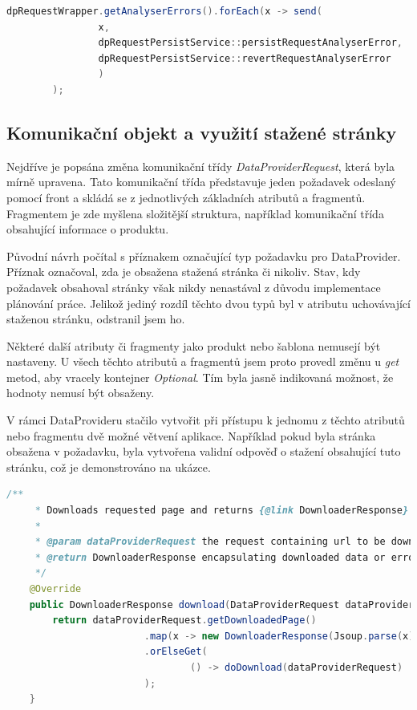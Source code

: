 \documentclass[thesis=B,czech]{FITthesis}[2012/06/26]
\begin{document}
\begin{lstlisting}[language=Java, caption={Příklad zavolání metody odesílající požadavky}]
        dpRequestWrapper.getAnalyserErrors().forEach(x -> send(
                x,
                dpRequestPersistService::persistRequestAnalyserError,
                dpRequestPersistService::revertRequestAnalyserError
                )
        );
\end{lstlisting}

\subsection{Komunikační objekt a využití stažené stránky}
Nejdříve je popsána změna komunikační třídy \textit{DataProviderRequest}, která byla mírně upravena.
Tato komunikační třída představuje jeden požadavek odeslaný pomocí front a skládá se z jednotlivých základních atributů a fragmentů.
Fragmentem je zde myšlena složitější struktura, například komunikační třída obsahující informace o produktu.
\par
Původní návrh počítal s příznakem označující typ požadavku pro DataProvider. Příznak označoval, zda je obsažena stažená stránka či nikoliv. Stav, kdy požadavek obsahoval stránky však nikdy nenastával z důvodu implementace plánování práce. Jelikož jediný rozdíl těchto dvou typů byl v atributu uchovávající staženou stránku, odstranil jsem ho.
\par
Některé další atributy či fragmenty jako produkt nebo šablona nemusejí být nastaveny. U všech těchto atributů a fragmentů jsem proto provedl změnu u \textit{get} metod, aby vracely kontejner \textit{Optional}. Tím byla jasně indikovaná možnost, že hodnoty nemusí být obsaženy.
\par
V rámci DataProvideru stačilo vytvořit při přístupu k jednomu z těchto atributů nebo fragmentu dvě možné větvení aplikace.
Například pokud byla stránka obsažena v požadavku, byla vytvořena validní odpověď o stažení obsahující tuto stránku, což je demonstrováno 
na ukázce.

\begin{lstlisting}[language=Java, caption={Veřejná metoda třídy \textit{DPDownloaderServiceImpl} zajišťující stažení stránky obsahující detail produktu}]
    /**
     * Downloads requested page and returns {@link DownloaderResponse} object.
     *
     * @param dataProviderRequest the request containing url to be downloaded
     * @return DownloaderResponse encapsulating downloaded data or error
     */
    @Override
    public DownloaderResponse download(DataProviderRequest dataProviderRequest) {
        return dataProviderRequest.getDownloadedPage()
                        .map(x -> new DownloaderResponse(Jsoup.parse(x)))
                        .orElseGet(
                                () -> doDownload(dataProviderRequest)
                        );
    }
\end{lstlisting}
\end{document}

